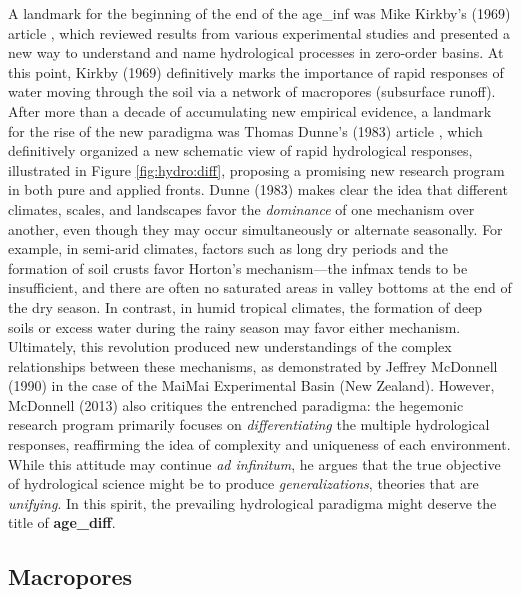 \documentclass[./main_en.tex]{subfiles}
\begin{document}
\par A landmark for the beginning of the end of the \gls{age_inf} was Mike Kirkby's (1969) article \cite{Kirkby1969}, which reviewed results from various experimental studies and presented a new way to understand and name hydrological processes in zero-order basins. At this point, Kirkby (1969) definitively marks the importance of rapid responses of water moving through the soil via a network of macropores (subsurface runoff). After more than a decade of accumulating new empirical evidence, a landmark for the rise of the new \gls{paradigma} was Thomas Dunne's (1983) article \cite{Dunne1983}, which definitively organized a new schematic view of rapid hydrological responses, illustrated in Figure \ref{fig:hydro:diff}, proposing a promising new research program in both pure and applied fronts. Dunne (1983) makes clear the idea that different climates, scales, and landscapes favor the \textit{dominance} of one mechanism over another, even though they may occur simultaneously or alternate seasonally. For example, in semi-arid climates, factors such as long dry periods and the formation of soil crusts favor Horton’s mechanism—the \gls{infmax} tends to be insufficient, and there are often no saturated areas in valley bottoms at the end of the dry season. In contrast, in humid tropical climates, the formation of deep soils or excess water during the rainy season may favor either mechanism. Ultimately, this revolution produced new understandings of the complex relationships between these mechanisms, as demonstrated by Jeffrey McDonnell (1990) \cite{mcdonnell1990} in the case of the MaiMai Experimental Basin (New Zealand). However, McDonnell (2013) \cite{Mcdonnell2013} also critiques the entrenched \gls{paradigma}: the hegemonic research program primarily focuses on \textit{differentiating} the multiple hydrological responses, reaffirming the idea of complexity and uniqueness of each environment. While this attitude may continue \textit{ad infinitum}, he argues that the true objective of hydrological science might be to produce \textit{generalizations}, theories that are \textit{unifying}. In this spirit, the prevailing hydrological \gls{paradigma} might deserve the title of \textbf{\gls{age_diff}}.

\subsection{Macropores}
\end{document}

